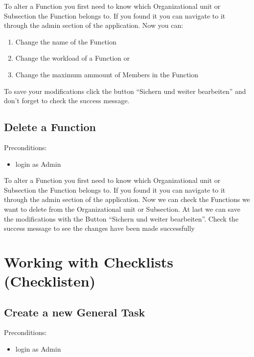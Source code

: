 \documentclass[letterpaper,10pt,english]{sphinxmanual}
\begin{document}
To alter a Function you first need to know which Organizational unit or
Subsection the Function belongs to. If you found it you can navigate to it
through the admin section of the application. Now you can:
\begin{enumerate}
%
\item {} 
Change the name of the Function

\item {} 
Change the workload of a Function or

\item {} 
Change the maximum ammount of Members in the Function

\end{enumerate}

To save your modifications click the button “Sichern und weiter bearbeiten”
and don’t forget to check the success message.


\subsection{Delete a Function}
\label{\detokenize{masterUserDoc:delete-a-function}}
Pre\sphinxhyphen{}conditions:
\begin{itemize}
\item {} 
login as Admin

\end{itemize}

To alter a Function you first need to know which Organizational unit or
Subsection the Function belongs to. If you found it you can navigate to it
through the admin section of the application. Now we can check the Functions
we want to delete from the Organizational unit or Subsection.
At last we can save the modifications with the Button
“Sichern und weiter bearbeiten”.
Check the success message to see the changes have been made successfully


\section{Working with Checklists (Checklisten)}
\label{\detokenize{masterUserDoc:working-with-checklists-checklisten}}

\subsection{Create a new General Task}
\label{\detokenize{masterUserDoc:create-a-new-general-task}}
Pre\sphinxhyphen{}conditions:
\begin{itemize}
\item {} 
login as Admin

\end{itemize}
\end{document}
